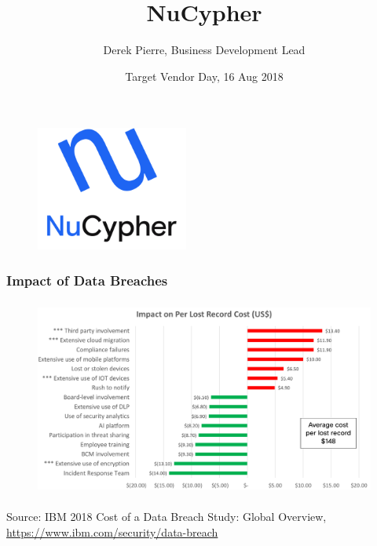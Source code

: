 \documentclass[xetex,mathsans,sans,aspectratio=169]{beamer}
\title[NuCypher]{NuCypher}
\author[Derek Pierre]{Derek Pierre, Business Development Lead}
\date[16 Aug 2018]{Target Vendor Day, 16 Aug 2018}
\begin{document}
    \begin{frame}
        \titlepage
        \begin{figure}
            \centering
            \includegraphics[width=5cm]{pdf/nucypher_logo.pdf}
        \end{figure}
    \end{frame}



    \begin{frame}
      \frametitle{Impact of Data Breaches}
        \begin{figure}
            \centering
            \includegraphics[height=6.5cm]{pdf/impact-of-data-breaches.pdf}
        \end{figure}

        {\tiny Source: IBM 2018 Cost of a Data Breach Study: Global Overview, \url{https://www.ibm.com/security/data-breach} \par}
    \end{frame}
\end{document}
